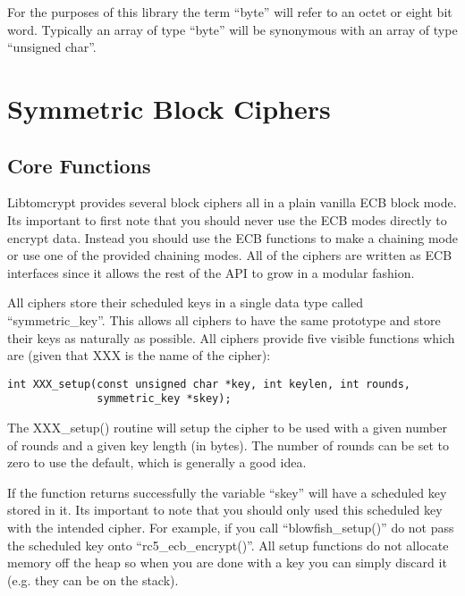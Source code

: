 \documentclass{book}
\begin{document}
For the purposes of this library the term ``byte'' will refer to an octet or eight bit word.  Typically an array of
type ``byte'' will be synonymous with an array of type ``unsigned char''.

\chapter{Symmetric Block Ciphers}
\section{Core Functions}

Libtomcrypt provides several block ciphers all in a plain vanilla ECB block mode.  Its important to first note that you 
should never use the ECB modes directly to encrypt data.  Instead you should use the ECB functions to make a chaining mode
or use one of the provided chaining modes.  All of the ciphers are written as ECB interfaces since it allows the rest of
the API to grow in a modular fashion.

All ciphers store their scheduled keys in a single data type called ``symmetric\_key''.  This allows all ciphers to 
have the same prototype and store their keys as  naturally as possible.  All ciphers provide five visible functions which
are (given that XXX is the name of the cipher):
\begin{verbatim}
int XXX_setup(const unsigned char *key, int keylen, int rounds, 
              symmetric_key *skey);
\end{verbatim}

The XXX\_setup() routine will setup the cipher to be used with a given number of rounds and a given key length (in bytes).
The number of rounds can be set to zero to use the default, which is generally a good idea.

If the function returns successfully the variable ``skey'' will have a scheduled key stored in it.  Its important to note
that you should only used this scheduled key with the intended cipher.  For example, if you call 
``blowfish\_setup()'' do not pass the scheduled key onto ``rc5\_ecb\_encrypt()''.  All setup functions do not allocate 
memory off the heap so when you are done with a key you can simply discard it (e.g. they can be on the stack).
\end{document}
